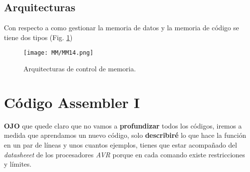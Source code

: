 \documentclass[
	12pt, %
	fleqn, %
	a4paper, %
]{LegrandOrangeBook}
\begin{document}
\subsection{Arquitecturas}
Con respecto a como gestionar la memoria de datos y la memoria de código se tiene dos tipos (Fig. \ref{fig: arch memoria})
\begin{figure}[]
\centering
\texttt{[image: MM/MM14.png]}
\caption{Arquitecturas de control de memoria.}
\label{fig: arch memoria}
\end{figure}
\section{Código Assembler I}
\textbf{OJO} que quede claro que no vamos a \textbf{profundizar} todos los códigos, iremos a medida que aprendamos un nuevo código, solo \textbf{describiré} lo que hace la función en un par de líneas y unos cuantos ejemplos, tienes que estar acompañado del \textit{datasheeet} de los procesadores \textit{AVR} porque en cada comando existe restricciones y límites.
\end{document}
